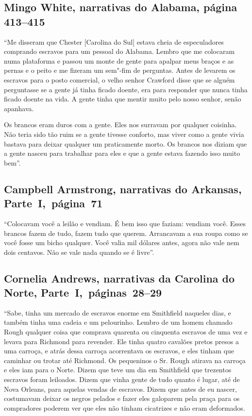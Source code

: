 \subsection{Mingo White, narrativas do Alabama, página 413--415}
\label{ref287}

``Me disseram que Chester {[}Carolina do Sul{]} estava cheia de
especuladores comprando escravos para um pessoal do Alabama. Lembro que
me colocaram numa plataforma e passou um monte de gente para apalpar
meus braços e as pernas e o peito e me fizeram um sem"-fim de perguntas.
Antes de levarem os escravos para o posto comercial, o velho senhor
Crawford disse que se alguém perguntasse se a gente já tinha ficado
doente, era para responder que nunca tinha ficado doente na vida. A
gente tinha que mentir muito pelo nosso senhor, senão apanhava.

Os brancos eram duros com a gente. Eles nos surravam por qualquer
coisinha. Não teria sido tão ruim se a gente tivesse conforto, mas viver
como a gente vivia bastava para deixar qualquer um praticamente morto. Os
brancos nos diziam que a gente nasceu para trabalhar para eles e que a
gente estava fazendo isso muito bem''.

\subsection{Campbell Armstrong, narrativas do Arkansas, Parte~I,~página~71} \label{ref11}

``Colocavam você a leilão e vendiam. É bem isso que faziam: vendiam
você. Esses brancos fazem de tudo, fazem tudo que querem. Arrancavam a
sua roupa como se você fosse um bicho qualquer. Você valia mil dólares
antes, agora não vale nem dois centavos. Não se vale nada quando se é
livre''.

\subsection{Cornelia Andrews, narrativas da Carolina do Norte, Parte~I,~páginas~28--29} \label{ref08}

``Sabe, tinha um mercado de escravos enorme em Smithfield naqueles dias,
e também tinha uma cadeia e um pelourinho. Lembro de um homem chamado
Rough qualquer coisa que comprava quarenta ou cinquenta escravos de uma
vez e levava para Richmond para revender. Ele tinha quatro cavalões
pretos presos a uma carroça, e atrás dessa carroça acorrentava os
escravos, e eles tinham que caminhar ou trotar até Richmond. Os
pequeninos o Sr. Rough atirava na carroça e eles iam para o Norte. Dizem
que teve um dia em Smithfield que trezentos escravos foram leiloados.
Dizem que vinha gente de tudo quanto é lugar, até de Nova Orleans, para
aquelas vendas de escravos. Dizem que antes de eu nascer, costumavam
deixar os negros pelados e fazer eles galoparem pela praça para os
compradores poderem ver que eles não tinham cicatrizes e não eram
deformados.


